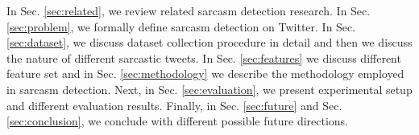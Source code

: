 In Sec. \ref{sec:related}, we review related sarcasm detection research. In Sec. \ref{sec:problem}, we formally define sarcasm detection on Twitter. In Sec. \ref{sec:dataset}, we discuss dataset collection procedure in detail and then we discuss the nature of different sarcastic tweets. In Sec. \ref{sec:features} we discuss different feature set and in Sec. \ref{sec:methodology} we describe the methodology employed in sarcasm detection. Next, in Sec. \ref{sec:evaluation}, we present experimental setup and different evaluation results. Finally, in Sec. \ref{sec:future} and Sec. \ref{sec:conclusion}, we conclude with different possible future directions.



